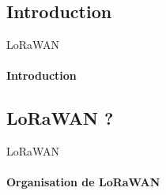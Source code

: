 \subsection{Introduction}

\begin{frame}{LoRaWAN}
\framesubtitle{Introduction}

\end{frame}

\subsection{LoRaWAN ?}

\begin{frame}{LoRaWAN}
\framesubtitle{Organisation de LoRaWAN}
\begin{columns}
  \begin{column}{0.5\textwidth}
        
  \end{column}
  \begin{column}{0.5\textwidth}
  \end{column}
\end{columns}
\end{frame}

